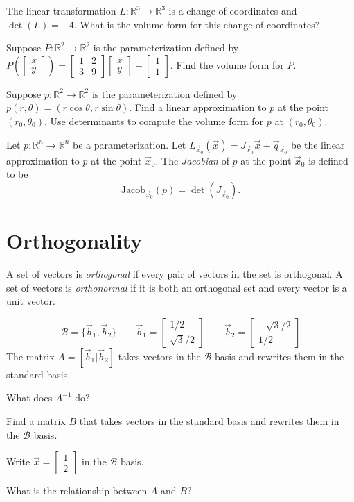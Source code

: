 \documentclass[14pt]{problemset}
\newcommand{\R}{\mathbb{R}}
\newcommand{\mat}[1]{\begin{bmatrix}#1\end{bmatrix}}
\begin{document}
	\question
	\begin{parts}
		\item The linear transformation $L:\R^3\to\R^3$ is a change of coordinates and $\det(L)=-4$.
			What is the volume form for this change of coordinates?
		\item Suppose $P:\R^2\to\R^2$ is the parameterization defined by $P\left(\mat{x\\y}\right)=\mat{1&2\\3&9}\mat{x\\y}+\mat{1\\1}$.
			Find the volume form for $P$.
		\item Suppose $p:\R^2\to\R^2$ is the parameterization defined by $p(r,\theta)=(r\cos\theta,r\sin\theta)$.  Find
			a linear approximation to $p$ at the point $(r_0,\theta_0)$.  Use determinants to compute the volume form for $p$
			at $(r_0,\theta_0)$.
	\end{parts}
	\begin{definition}[Jacobian]
		Let $p:\R^n\to\R^n$ be a parameterization.  Let $L_{\vec x_0}(\vec x) = J_{\vec x_0}\vec x+\vec q_{\vec x_0}$
		be the linear approximation to $p$ at the point $\vec x_0$.  The \emph{Jacobian} of $p$ at the point $\vec x_0$
		is defined to be
		\[
			\mathrm{Jacob}_{\vec x_0}(p) = \det(J_{\vec x_0}).
		\]
	\end{definition}



\section*{Orthogonality}
	\begin{definition}
		A set of vectors is \emph{orthogonal} if every pair of vectors
		in the set is orthogonal.  A set of vectors is \emph{orthonormal}
		if it is both an orthogonal set and every vector is a unit vector.
	\end{definition}

	\question
	\[
		\mathcal B=\{\vec b_1,\vec b_2\}\qquad\vec b_1=\mat{1/2\\\sqrt{3}/2}
		\qquad \vec b_2=\mat{-\sqrt{3}/2\\1/2}
	\]
	The matrix $A=[\vec b_1|\vec b_2]$ takes vectors in the $\mathcal B$ basis
	and rewrites them in the standard basis.
	\begin{parts}
		\item What does $A^{-1}$ do?
		\item Find a matrix $B$ that takes vectors in the standard basis
			and rewrites them in the $\mathcal B$ basis.
		\item Write $\vec x=\mat{1\\2}$ in the $\mathcal B$ basis.
		\item What is the relationship between $A$ and $B$?
	\end{parts}
\end{document}
